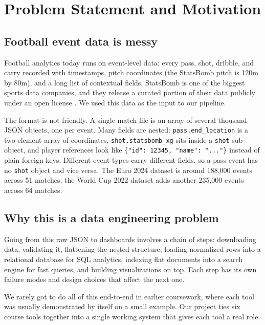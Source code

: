 \documentclass[conference]{IEEEtran}
\begin{document}
\section{Problem Statement and Motivation}

\subsection{Football event data is messy}

Football analytics today runs on event-level data: every pass, shot, dribble,
and carry recorded with timestamps, pitch coordinates (the StatsBomb pitch is
120m by 80m), and a long list of contextual fields. StatsBomb is one of the
biggest sports data companies, and they release a curated portion of their data
publicly under an open license \cite{statsbomb_open}. We used this data as the
input to our pipeline.

The format is not friendly. A single match file is an array of several thousand
JSON objects, one per event. Many fields are nested: \texttt{pass.end\_location}
is a two-element array of coordinates, \texttt{shot.statsbomb\_xg} sits inside
a \texttt{shot} sub-object, and player references look like
\texttt{\{"id": 12345, "name": "..."\}} instead of plain foreign keys. Different
event types carry different fields, so a pass event has no \texttt{shot} object
and vice versa. The Euro 2024 dataset is around 188{,}000 events across 51
matches; the World Cup 2022 dataset adds another 235{,}000 events across 64
matches.

\subsection{Why this is a data engineering problem}

Going from this raw JSON to dashboards involves a chain of steps: downloading
data, validating it, flattening the nested structure, loading normalized rows
into a relational database for SQL analytics, indexing flat documents into a
search engine for fast queries, and building visualizations on top. Each step
has its own failure modes and design choices that affect the next one.

We rarely got to do all of this end-to-end in earlier coursework, where each
tool was usually demonstrated by itself on a small example. Our project ties
six course tools together into a single working system that gives each tool a
real role.
\end{document}
